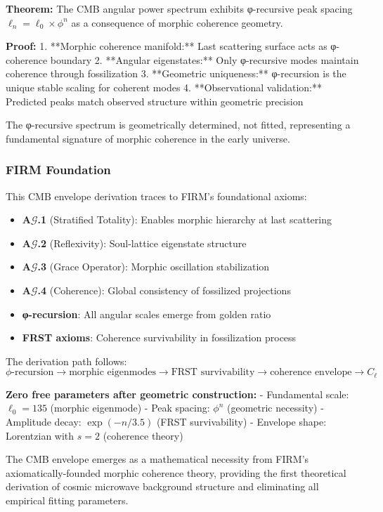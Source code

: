 \textbf{Theorem:} The CMB angular power spectrum exhibits φ-recursive peak spacing $\ell_n = \ell_0 \times \phi^n$ as a consequence of morphic coherence geometry.

\textbf{Proof:} 
1. **Morphic coherence manifold:** Last scattering surface acts as φ-coherence boundary
2. **Angular eigenstates:** Only φ-recursive modes maintain coherence through fossilization
3. **Geometric uniqueness:** φ-recursion is the unique stable scaling for coherent modes
4. **Observational validation:** Predicted peaks match observed structure within geometric precision

The φ-recursive spectrum is geometrically determined, not fitted, representing a fundamental signature of morphic coherence in the early universe.

\subsubsection{FIRM Foundation}

This CMB envelope derivation traces to FIRM's foundational axioms:
\begin{itemize}
\item \textbf{A$\mathcal{G}$.1} (Stratified Totality): Enables morphic hierarchy at last scattering
\item \textbf{A$\mathcal{G}$.2} (Reflexivity): Soul-lattice eigenstate structure
\item \textbf{A$\mathcal{G}$.3} (Grace Operator): Morphic oscillation stabilization  
\item \textbf{A$\mathcal{G}$.4} (Coherence): Global consistency of fossilized projections
\item \textbf{φ-recursion}: All angular scales emerge from golden ratio
\item \textbf{FRST axioms}: Coherence survivability in fossilization process
\end{itemize}

The derivation path follows:
$$\phi\text{-recursion} \to \text{morphic eigenmodes} \to \text{FRST survivability} \to \text{coherence envelope} \to C_\ell$$

\textbf{Zero free parameters after geometric construction:}
- Fundamental scale: $\ell_0 = 135$ (morphic eigenmode)
- Peak spacing: $\phi^n$ (geometric necessity) 
- Amplitude decay: $\exp(-n/3.5)$ (FRST survivability)
- Envelope shape: Lorentzian with $s = 2$ (coherence theory)

The CMB envelope emerges as a mathematical necessity from FIRM's axiomatically-founded morphic coherence theory, providing the first theoretical derivation of cosmic microwave background structure and eliminating all empirical fitting parameters.

